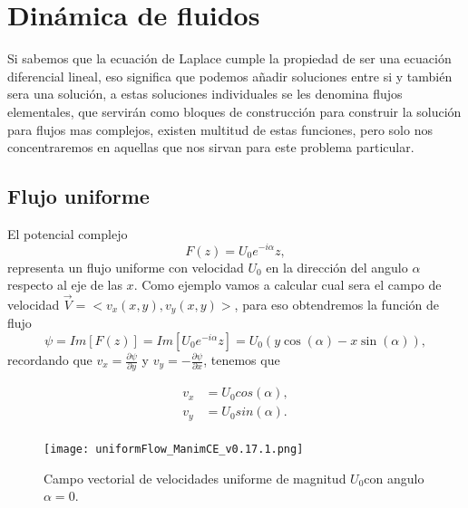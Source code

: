 \documentclass[12pt]{article}
\begin{document}
\section{Dinámica de fluidos}
		Si sabemos que la ecuación de Laplace cumple la propiedad de ser una ecuación diferencial lineal, eso significa que podemos añadir soluciones entre si y también sera una solución, a estas soluciones individuales se les denomina flujos elementales, que servirán como bloques de construcción para construir la solución para flujos mas complejos, existen multitud de estas funciones, pero solo nos concentraremos en aquellas que nos sirvan para este problema particular.
		\subsection{Flujo uniforme}
			El potencial complejo 
			\begin{equation}
				F(z) = U_0 e^{-i\alpha}z,
			\end{equation}
			representa un flujo uniforme con velocidad $U_0$ en la dirección del angulo $\alpha$ respecto al eje de las $x$.
			Como ejemplo vamos a calcular cual sera el campo de velocidad $\vec{V}=<v_x (x,y),v_y (x,y)>$, para eso obtendremos la función de flujo 
			\begin{equation*}
				\psi = Im[F(z)] = Im[U_0 e^{-i\alpha}z] =	U_0(y \cos{\left(\alpha \right)}- x \sin{\left(\alpha \right)} ),
			\end{equation*}
			recordando que $v_x = \frac{\partial \psi}{\partial y}$ y $ v_y = -\frac{\partial \psi}{\partial x}$, tenemos que
			
			\begin{equation*}
				\begin{split}
				v_x &= U_0 cos(\alpha),\\
				v_y &= U_0 sin(\alpha).\\
				\end{split}
			\end{equation*}
			\begin{figure}[!h]
				\begin{small}
					\begin{center}
						\texttt{[image: uniformFlow\_ManimCE\_v0.17.1.png]}
					\end{center}
					\caption{Campo vectorial de velocidades uniforme de magnitud $U_0 $con angulo $\alpha = 0$.}
				\end{small}
			\end{figure}
			
\end{document}
